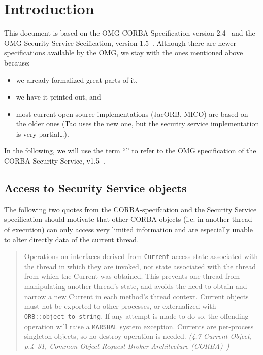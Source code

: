 
\section{Introduction} \label{sec:intro}

This document is based on the OMG CORBA Specification version
2.4~\cite{omg:CORBA:2.4:2000} and the OMG Security Service Secification, version
1.5~\cite{omg:Security:1.5:2000}.  Although there are
newer specifications available by the OMG, we stay with the ones mentioned above
because:
\begin{itemize}
\item we already formalized great parts of it, 
\item we have it printed out, and
\item most current open source implementations (JacORB, MICO) are based on the
  older ones (Tao uses the new one, but the security service implementation is
  very partial\dots).
\end{itemize}

In the following, we will use the term ``\corbasec'' to refer to the OMG
specification of the CORBA Security Service, v1.5~\cite{omg:Security:1.5:2000}.


\subsection{Access to Security Service objects}

The following two quotes from the CORBA-specifcation and the Security Service
specification should motivate that other CORBA-objects (i.e. in another thread
of execution) can only access very limited information and are especially unable
to alter directly data of the current thread.

\begin{quote}
  Operations on interfaces derived from \texttt{Current} access state associated
  with the thread in which they are invoked, not state associated with the
  thread from which the Current was obtained. This prevents one thread from
  manipulating another thread's state, and avoids the need to obtain and narrow
  a new Current in each method's thread context.  Current objects must not be
  exported to other processes, or externalized with
  \texttt{ORB::object\_to\_string}. If any attempt is made to do so, the
  offending operation will raise a \texttt{MARSHAL} system exception.  Currents
  are per-process singleton objects, so no destroy operation is needed.
  \hspace{3ex} \emph{(4.7 Current Object, p.4--31, Common Object Request Broker
    Architecture (CORBA)~\cite{omg:CORBA:2.4:2000})}
\end{quote}

